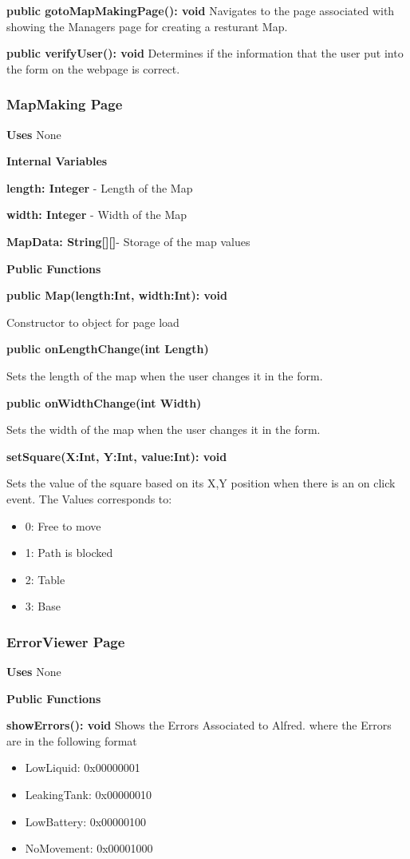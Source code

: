 \documentclass [10pt]{article}
\begin{document}
\textbf{public gotoMapMakingPage(): void}
Navigates to the page associated with showing the Managers page for creating a resturant Map.

\textbf{public verifyUser(): void}
Determines if the information that the user put into the form on the webpage is correct.


\subsubsection{MapMaking Page}
\textbf{Uses}
None

\textbf{Internal Variables}

\textbf{length: Integer} - Length of the Map

\textbf{width: Integer} - Width of the Map

\textbf{MapData: String[][]}- Storage of the map values

\textbf{Public Functions}

\textbf{public Map(length:Int, width:Int): void}

Constructor to object for page load

\textbf{public onLengthChange(int Length)}

Sets the length of the map when the user changes it in the form.

\textbf{public onWidthChange(int Width)}

Sets the width of the map when the user changes it in the form.

\textbf{setSquare(X:Int, Y:Int, value:Int): void}

Sets the value of the square based on its X,Y position when there is an on click event. The Values corresponds to: 
 
\begin{itemize}
	\item 0: Free to move
	\item 1: Path is blocked
	\item 2: Table
	\item 3: Base
\end{itemize}

\subsubsection{ErrorViewer Page}
\textbf{Uses}
None

\textbf{Public Functions}

\textbf{ showErrors(): void}
Shows the Errors Associated to Alfred. where the Errors are in the following format
\begin{itemize}
	\item LowLiquid: 0x00000001
	\item LeakingTank: 0x00000010
	\item LowBattery: 0x00000100
	\item NoMovement: 0x00001000
\end{itemize}
\end{document}

